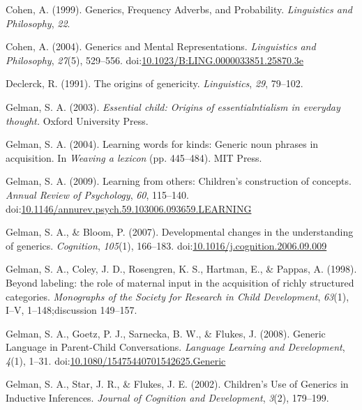 \documentclass[floatsintext,man]{apa6}
\theoremstyle{definition}
\theoremstyle{definition}
\theoremstyle{definition}
\theoremstyle{remark}
\begin{document}
\hypertarget{ref-Cohen1999}{}
Cohen, A. (1999). Generics, Frequency Adverbs, and Probability.
\emph{Linguistics and Philosophy}, \emph{22}.

\hypertarget{ref-Cohen2004}{}
Cohen, A. (2004). Generics and Mental Representations. \emph{Linguistics
and Philosophy}, \emph{27}(5), 529--556.
doi:\href{https://doi.org/10.1023/B:LING.0000033851.25870.3e}{10.1023/B:LING.0000033851.25870.3e}

\hypertarget{ref-Declerck1991}{}
Declerck, R. (1991). The origins of genericity. \emph{Linguistics},
\emph{29}, 79--102.

\hypertarget{ref-Gelman2003}{}
Gelman, S. A. (2003). \emph{Essential child: Origins of
essentialntialism in everyday thought.} Oxford University Press.

\hypertarget{ref-Gelman2004}{}
Gelman, S. A. (2004). Learning words for kinds: Generic noun phrases in
acquisition. In \emph{Weaving a lexicon} (pp. 445--484). MIT Press.

\hypertarget{ref-Gelman2009}{}
Gelman, S. A. (2009). Learning from others: Children's construction of
concepts. \emph{Annual Review of Psychology}, \emph{60}, 115--140.
doi:\href{https://doi.org/10.1146/annurev.psych.59.103006.093659.LEARNING}{10.1146/annurev.psych.59.103006.093659.LEARNING}

\hypertarget{ref-Gelman2007}{}
Gelman, S. A., \& Bloom, P. (2007). Developmental changes in the
understanding of generics. \emph{Cognition}, \emph{105}(1), 166--183.
doi:\href{https://doi.org/10.1016/j.cognition.2006.09.009}{10.1016/j.cognition.2006.09.009}

\hypertarget{ref-Gelman1998}{}
Gelman, S. A., Coley, J. D., Rosengren, K. S., Hartman, E., \& Pappas,
A. (1998). Beyond labeling: the role of maternal input in the
acquisition of richly structured categories. \emph{Monographs of the
Society for Research in Child Development}, \emph{63}(1), I--V,
1--148;discussion 149--157.

\hypertarget{ref-Gelman2008}{}
Gelman, S. A., Goetz, P. J., Sarnecka, B. W., \& Flukes, J. (2008).
Generic Language in Parent-Child Conversations. \emph{Language Learning
and Development}, \emph{4}(1), 1--31.
doi:\href{https://doi.org/10.1080/15475440701542625.Generic}{10.1080/15475440701542625.Generic}

\hypertarget{ref-Gelman2002}{}
Gelman, S. A., Star, J. R., \& Flukes, J. E. (2002). Children's Use of
Generics in Inductive Inferences. \emph{Journal of Cognition and
Development}, \emph{3}(2), 179--199.
\end{document}
